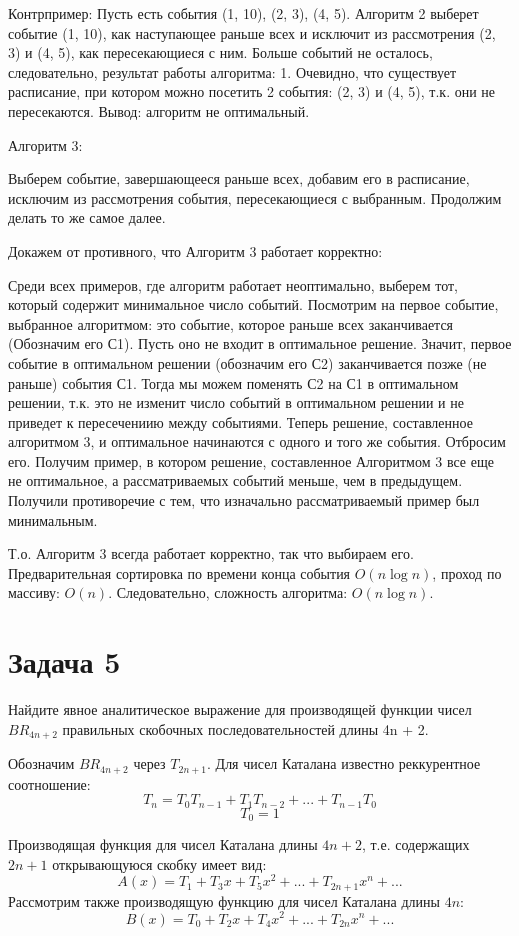 \documentclass{article}
\begin{document}
Контрпример:
    Пусть есть события (1, 10), (2, 3), (4, 5). Алгоритм 2 выберет событие (1, 10), как наступающее раньше всех и исключит из рассмотрения (2, 3) и (4, 5), как пересекающиеся с ним. Больше событий не осталось, следовательно, результат работы алгоритма: 1. Очевидно, что существует расписание, при котором можно посетить 2 события: (2, 3) и (4, 5), т.к. они не пересекаются. Вывод: алгоритм не оптимальный.

Алгоритм 3:

Выберем событие, завершающееся раньше всех, добавим его в расписание, исключим из рассмотрения события, пересекающиеся с выбранным. Продолжим делать то же самое далее.


Докажем от противного, что Алгоритм 3 работает корректно:

Среди всех примеров, где алгоритм работает неоптимально, выберем тот, который содержит минимальное число событий. Посмотрим на первое событие, выбранное алгоритмом: это событие, которое раньше всех заканчивается (Обозначим его С1). Пусть оно не входит в оптимальное решение. Значит, первое событие в оптимальном решении (обозначим его С2) заканчивается позже (не раньше) события С1. Тогда мы можем поменять С2 на С1 в оптимальном решении, т.к. это не изменит число событий в оптимальном решении и не приведет к пересечениию между событиями. Теперь решение, составленное алгоритмом 3, и оптимальное начинаются с одного и того же события. Отбросим его. Получим пример, в котором решение, составленное Алгоритмом 3 все еще не оптимальное, а рассматриваемых событий меньше, чем в предыдущем. Получили противоречие с тем, что изначально рассматриваемый пример был минимальным.

Т.о. Алгоритм 3 всегда работает корректно, так что выбираем его.
Предварительная сортировка по времени конца события ${O}(n\log{}n)$, проход по массиву: ${O}(n)$. 
Следовательно, сложность алгоритма: ${O}(n\log{}n)$.

\section*{Задача 5}
Найдите явное аналитическое выражение для производящей
функции чисел $BR_{4n+2}$ правильных скобочных последовательностей
длины 4n + 2.

Обозначим $BR_{4n+2}$ через $T_{2n+1}$. Для чисел Каталана известно реккурентное соотношение: $$T_n = T_0T_{n-1} + T_1T_{n-2}+ ... + T_{n-1}T_0$$ $$T_0 = 1$$

Производящая функция для чисел Каталана длины $4n+2$, т.е. содержащих $2n+1$ открывающуюся скобку имеет вид: $$A(x) = T_1+T_3x+ T_5x^2+...+T_{2n+1}x^n+...$$
Рассмотрим также производящую функцию для чисел Каталана длины $4n$: $$B(x) = T_0+T_2x+ T_4x^2+...+T_{2n}x^n+...$$
\end{document}
